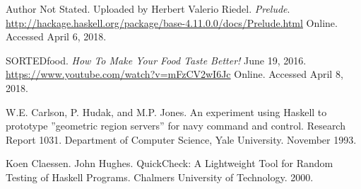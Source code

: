 \documentclass[11pt]{article}
\begin{document}
\begin{thebibliography}{14}
        Author Not Stated. Uploaded by Herbert Valerio Riedel. \textit{Prelude}.
        \url{http://hackage.haskell.org/package/base-4.11.0.0/docs/Prelude.html}
        Online. Accessed April 6, 2018.

        SORTEDfood. \textit{How To Make Your Food Taste Better!} June 19, 2016.
        \url{https://www.youtube.com/watch?v=mFzCV2wI6Jc}
        Online. Accessed April 8, 2018.

        W.E. Carlson, P. Hudak, and M.P. Jones. An experiment using
        Haskell to prototype ”geometric region servers” for navy command
        and control. Research Report 1031. Department of Computer Science,
        Yale University. November 1993.

        Koen Claessen. John Hughes. QuickCheck: A Lightweight Tool for
        Random Testing of Haskell Programs. Chalmers University of Technology.
        2000.

    \end{thebibliography}   

    \newpage

    \appendix
\end{document}

